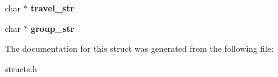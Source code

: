 \begin{DoxyCompactItemize}
\item 
\hypertarget{structqe__data_a79634c011f099c5c9f31572fcf60683b}{char $\ast$ {\bfseries travel\-\_\-str}}\label{structqe__data_a79634c011f099c5c9f31572fcf60683b}

\item 
\hypertarget{structqe__data_a3ad2455b0ef04aa965c3f33d16814bfc}{char $\ast$ {\bfseries group\-\_\-str}}\label{structqe__data_a3ad2455b0ef04aa965c3f33d16814bfc}

\end{DoxyCompactItemize}


The documentation for this struct was generated from the following file\-:\begin{DoxyCompactItemize}
\item 
structs.\-h\end{DoxyCompactItemize}
